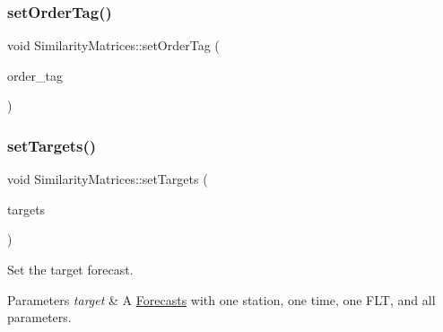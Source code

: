\mbox{\label{class_similarity_matrices_a622de4627aa3f6ac6dab361127a5c365}} 
\subsubsection{\texorpdfstring{set\+Order\+Tag()}{setOrderTag()}}
{\footnotesize\ttfamily void Similarity\+Matrices\+::set\+Order\+Tag (\begin{DoxyParamCaption}\item[{\mbox{\hyperlink{class_similarity_matrices_a8fea56a2e7c8a9f692753c8f706e5706}{C\+O\+L\+\_\+\+T\+AG}}}]{order\+\_\+tag }\end{DoxyParamCaption})}

\mbox{\label{class_similarity_matrices_a639c9702983460a7c0b443f3da7b18f4}} 
\subsubsection{\texorpdfstring{set\+Targets()}{setTargets()}}
{\footnotesize\ttfamily void Similarity\+Matrices\+::set\+Targets (\begin{DoxyParamCaption}\item[{const \mbox{\hyperlink{class_forecasts}{Forecasts}} \&}]{targets }\end{DoxyParamCaption})}

Set the target forecast.


\begin{DoxyParams}{Parameters}
{\em target} & A \mbox{\hyperlink{class_forecasts}{Forecasts}} with one station, one time, one F\+LT, and all parameters. \\
\hline
\end{DoxyParams}
\mbox{\label{class_similarity_matrices_a784407b5eee0d0436c03bf55f214160c}} 
